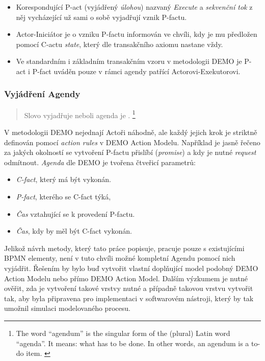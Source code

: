 \documentclass[]{article}
\begin{document}
\begin{itemize}
\item Korespondující P-act (vyjádřený \textit{úlohou}) nazvaný \textit{Execute} a \textit{sekvenční tok} z něj vycházející už sami o sobě vyjadřují vznik P-factu.
\item Actor-Iniciátor je o vzniku P-factu informován ve chvíli, kdy je mu předložen pomocí C-actu \textit{state}, který dle transakčního axiomu nastane vždy.
\item Ve standardním i základním transakčním vzoru v metodologii DEMO je P-act i P-fact uváděn pouze v rámci agendy patřící Actorovi-Exekutorovi.
\end{itemize}

\subsubsection{Vyjádření Agendy}

\begin{quote}
Slovo  vyjadřuje  neboli agenda je . \cite{Dietz2006}
\footnote{The word “agendum” is the singular form of the (plural) Latin word “agenda”. It means: what has to be done. In other words, an agendum is a to-do item. \cite{Dietz2006}}
\end{quote}

V metodologii DEMO nejednají Actoři náhodně, ale každý jejich krok je striktně definován pomocí \textit{action rules} v DEMO Action Modelu. Například je jasně řečeno  za jakých okolností se vytvoření P-factu přislíbí (\textit{promise}) a kdy je nutné \textit{request} odmítnout. \textit{Agenda} dle DEMO je tvořena čtveřicí parametrů:

\begin{itemize}
\item \textit{C-fact}, který má být vykonán.
\item \textit{P-fact}, kterého se C-fact týká,
\item \textit{Čas} vztahující se k provedení P-factu.
\item \textit{Čas}, kdy by měl být C-fact vykonán. %
\end{itemize}

Jelikož návrh metody, který tato práce popisuje, pracuje pouze s existujícími BPMN elementy, není v tuto chvíli možné kompletní Agendu pomocí nich vyjádřit. Řešením by bylo buď vytvořit vlastní doplňující model podobný DEMO Action Modelu nebo přímo DEMO Action Model. Dalším výzkumem je nutné ověřit, zda je vytvoření takové vrstvy nutné a případně takovou vrstvu vytvořit tak, aby byla připravena pro implementaci v softwarovém nástroji, který by tak umožnil simulaci modelovaného procesu.
\end{document}
